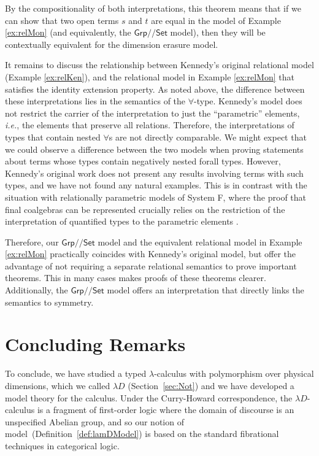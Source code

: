 \documentclass[a4paper,UKenglish]{lipics}
\theoremstyle{plain}
\newcommand{\msf}[1]{\mathsf{#1}} %
\newcommand{\Grp}{\msf{Grp}}
\newcommand{\Set}{\msf{Set}}
\newcommand{\Lslice}[1]{#1/\!/\Set}
\newcommand{\GrpSet}{\Lslice{\Grp}}
\begin{document}
\noindent
By the compositionality of both interpretations, this theorem means
that if we can show that two open terms $s$ and $t$ are equal in the
model of Example \ref{ex:relMon} (and equivalently, the $\GrpSet$
model), then they will be contextually equivalent for the dimension
erasure model.

It remains to discuss the relationship between Kennedy's original relational model (Example \ref{ex:relKen}), and the relational model in Example \ref{ex:relMon} that satisfies the identity extension property. As noted above, the difference between these interpretations lies in the semantics of the $\forall$-type. Kennedy's model does not restrict the carrier of the interpretation to just the ``parametric'' elements, \emph{i.e.}, the elements that preserve all relations. Therefore, the interpretations of types that contain nested $\forall$s are not directly comparable. We might expect that we could observe a difference between the two models when proving statements about terms whose types contain negatively nested forall types. However, Kennedy's original work does not present any results involving terms with such types, and we have not found any natural examples. This is in contrast with the situation with relationally parametric models of System F, where the proof that final coalgebras can be represented
crucially relies on the restriction of the interpretation of quantified types to the parametric elements \cite{birkedal2005categorical}.

Therefore, our $\GrpSet$ model and the equivalent relational model in Example \ref{ex:relMon} practically coincides with Kennedy's original model, but offer the advantage of not requiring a separate relational semantics to prove important theorems. This in many cases makes proofs of these theorems clearer. Additionally, the $\GrpSet$ model offers an interpretation that directly links the semantics to symmetry.

\section{Concluding Remarks} \label{sec:con}
To conclude, we have studied a typed $\lambda$-calculus with polymorphism over physical dimensions, which we called $\lambda D$ (Section~\ref{sec:Not}) and we have developed a model theory for the calculus. Under the Curry-Howard correspondence, the $\lambda D$-calculus is a fragment of first-order logic where the domain of discourse is an unspecified Abelian group, and so our notion of model~(Definition~\ref{def:lamDModel}) is based on the standard fibrational techniques in categorical logic.
\end{document}

